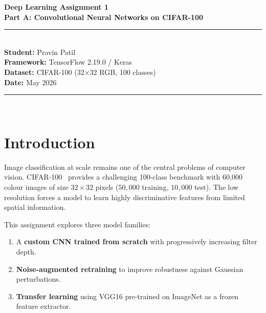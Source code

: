 \documentclass[12pt,a4paper]{article}
\begin{document}
\begin{titlepage}
\centering
\vspace*{2cm}
{\Huge\bfseries\color{accentcolor} Deep Learning Assignment 1}\\[0.5em]
{\Large\bfseries Part A: Convolutional Neural Networks on CIFAR-100}\\[2em]
\rule{0.6\linewidth}{0.8pt}\\[1.5em]
{\large\textbf{Student:} Pravin Patil}\\[0.5em]
{\large\textbf{Framework:} TensorFlow 2.19.0 / Keras}\\[0.5em]
{\large\textbf{Dataset:} CIFAR-100 (32$\times$32 RGB, 100 classes)}\\[0.5em]
{\large\textbf{Date:} May 2026}\\[2em]
\rule{0.6\linewidth}{0.4pt}\\[1.5em]
\begin{abstract}
\noindent
This report documents a systematic investigation of Convolutional Neural Networks (CNNs) applied to the CIFAR-100 image classification benchmark. Three experimental configurations are studied: (A1) a CNN trained from scratch, (A2) robustness evaluation under additive Gaussian noise, (A3) noise-augmented retraining to improve robustness, and (A4/A5) transfer learning via a frozen VGG16 backbone. Quantitative results are presented alongside a rigorous analysis of numerical methods, hyperparameter choices, and the accuracy–robustness trade-off inherent in each approach.
\end{abstract}
\vfill
\end{titlepage}

\section{Introduction}

Image classification at scale remains one of the central problems of computer vision. CIFAR-100~\cite{cifar} provides a challenging 100-class benchmark with 60{,}000 colour images of size $32\times32$ pixels ($50{,}000$ training, $10{,}000$ test). The low resolution forces a model to learn highly discriminative features from limited spatial information.

This assignment explores three model families:
\begin{enumerate}[noitemsep]
    \item A \textbf{custom CNN trained from scratch} with progressively increasing filter depth.
    \item \textbf{Noise-augmented retraining} to improve robustness against Gaussian perturbations.
    \item \textbf{Transfer learning} using VGG16 pre-trained on ImageNet as a frozen feature extractor.
\end{enumerate}
\end{document}

